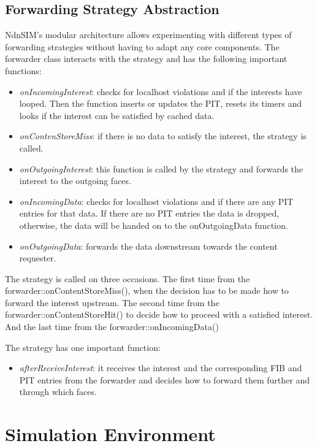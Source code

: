 \subsection{Forwarding Strategy Abstraction}

NdnSIM's modular architecture allows experimenting with different types of forwarding strategies without having to adapt any core components. The forwarder class interacts with the strategy and has the following important functions:

\begin{itemize}
\item \emph{onIncomingInterest}: checks for localhost violations and if the interests have looped. Then the function inserts or updates the PIT, resets its timers and looks if the interest can be satisfied by cached data.
\item \emph{onContenStoreMiss}: if there is no data to satisfy the interest, the strategy is called.
\item \emph{onOutgoingInterest}: this function is called by the strategy and forwards the interest to the outgoing faces.
\item \emph{onIncomingData}: checks for localhost violations and if there are any PIT entries for that data. If there are no PIT entries the data is dropped, otherwise, the data will be handed on to the onOutgoingData function.
\item \emph{onOutgoingData}: forwards the data downstream towards the content requester.
\end{itemize}


The strategy is called on three occasions. The first time from the forwarder::onContentStoreMiss(), when the decision has to be made how to forward the interest upstream. The second time from the forwarder::onContentStoreHit() to decide how to proceed with a satisfied interest. And the last time from the forwarder::onIncomingData()

\vspace{5mm} %

The strategy has one important function:

\begin{itemize}
\item \emph{afterReceiveInterest}: it receives the interest and the corresponding FIB and PIT entries from the forwarder and decides how to forward them further and through which faces.
\end{itemize}


\section{Simulation Environment}

